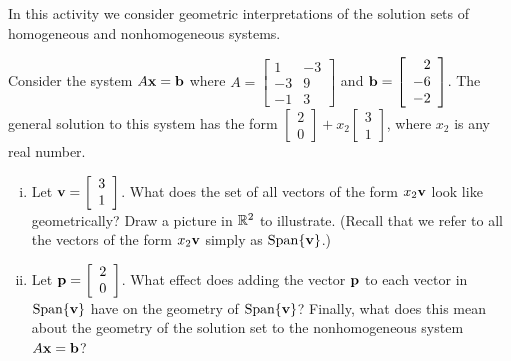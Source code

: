 \begin{activity} \label{ex:Homogeneous2} In this activity we consider geometric interpretations of the solution sets of homogeneous and nonhomogeneous systems.

\ba \item Consider the system $A \mathbf{x} = \mathbf{b}$ where $A = \left[ \begin{array}{rr} 1 & -3 \\ -3 & 9 \\ -1 & 3 \end{array} \right]$ and $\mathbf{b} =  \left[ \begin{array}{r} 2 \\ -6 \\ -2 \end{array} \right]$. The general solution to this system has the form $\left[ \begin{array}{c} 2 \\ 0 \end{array} \right] + x_2\left[ \begin{array}{c} 3 \\ 1 \end{array} \right]$, where $x_2$ is any real number.
\begin{enumerate}[i.]
    \item Let $\mathbf{v} = \left[ \begin{array}{c} 3 \\ 1 \end{array} \right]$. What does the set of all vectors of the form $x_2\mathbf{v}$ look like geometrically? Draw a picture in $\mathbb{R}^2$ to illustrate. (Recall that we refer to all the vectors of the form $x_2\mathbf{v}$ simply as $\text{Span} \{\mathbf{v}\}$.)

    

    \item Let $\mathbf{p} = \left[ \begin{array}{r} 2 \\ 0 \end{array} \right]$. What effect does adding the vector $\mathbf{p}$ to each vector in $\text{Span} \{\mathbf{v}\} $ have on the geometry of $\text{Span} \{\mathbf{v}\}$? Finally, what does this mean about the geometry of the solution set to the nonhomogeneous system $A \mathbf{x} = \mathbf{b}$?

    
		
\end{enumerate}


\end{activity}
